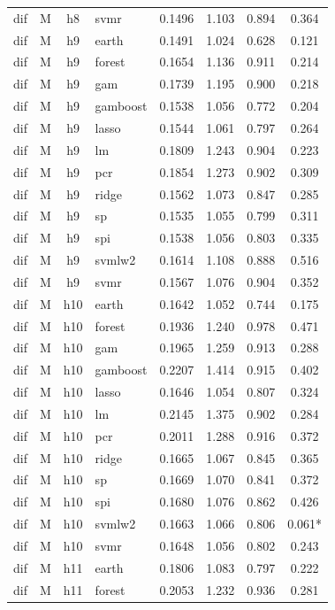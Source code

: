 \begin{ThreePartTable}
\begin{longtable}[t]{llclcccc}
dif & M & h8 & svmr & 0.1496 & 1.103 & 0.894 & 0.364\\
\addlinespace
dif & M & h9 & earth & 0.1491 & 1.024 & 0.628 & 0.121\\
dif & M & h9 & forest & 0.1654 & 1.136 & 0.911 & 0.214\\
dif & M & h9 & gam & 0.1739 & 1.195 & 0.900 & 0.218\\
dif & M & h9 & gamboost & 0.1538 & 1.056 & 0.772 & 0.204\\
dif & M & h9 & lasso & 0.1544 & 1.061 & 0.797 & 0.264\\
dif & M & h9 & lm & 0.1809 & 1.243 & 0.904 & 0.223\\
dif & M & h9 & pcr & 0.1854 & 1.273 & 0.902 & 0.309\\
dif & M & h9 & ridge & 0.1562 & 1.073 & 0.847 & 0.285\\
dif & M & h9 & sp & 0.1535 & 1.055 & 0.799 & 0.311\\
dif & M & h9 & spi & 0.1538 & 1.056 & 0.803 & 0.335\\
dif & M & h9 & svmlw2 & 0.1614 & 1.108 & 0.888 & 0.516\\
dif & M & h9 & svmr & 0.1567 & 1.076 & 0.904 & 0.352\\
\addlinespace
dif & M & h10 & earth & 0.1642 & 1.052 & 0.744 & 0.175\\
dif & M & h10 & forest & 0.1936 & 1.240 & 0.978 & 0.471\\
dif & M & h10 & gam & 0.1965 & 1.259 & 0.913 & 0.288\\
dif & M & h10 & gamboost & 0.2207 & 1.414 & 0.915 & 0.402\\
dif & M & h10 & lasso & 0.1646 & 1.054 & 0.807 & 0.324\\
dif & M & h10 & lm & 0.2145 & 1.375 & 0.902 & 0.284\\
dif & M & h10 & pcr & 0.2011 & 1.288 & 0.916 & 0.372\\
dif & M & h10 & ridge & 0.1665 & 1.067 & 0.845 & 0.365\\
dif & M & h10 & sp & 0.1669 & 1.070 & 0.841 & 0.372\\
dif & M & h10 & spi & 0.1680 & 1.076 & 0.862 & 0.426\\
dif & M & h10 & svmlw2 & 0.1663 & 1.066 & 0.806 & 0.061*\\
dif & M & h10 & svmr & 0.1648 & 1.056 & 0.802 & 0.243\\
\addlinespace
dif & M & h11 & earth & 0.1806 & 1.083 & 0.797 & 0.222\\
dif & M & h11 & forest & 0.2053 & 1.232 & 0.936 & 0.281\\

\end{longtable}
\end{ThreePartTable}
